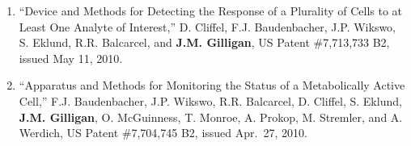 %
%
\begin{enumerate}
	\item ``Device and Methods for Detecting the Response of a Plurality of Cells to at Least One Analyte of Interest,'' D. Cliffel, F.J. Baudenbacher, J.P. Wikswo, S. Eklund, R.R. Balcarcel, and \textbf{J.M. Gilligan}, US Patent \#7,713,733 B2, issued May 11, 2010.
	\item ``Apparatus and Methods for Monitoring the Status of a Metabolically Active Cell,'' F.J. Baudenbacher, J.P. Wikswo, R.R. Balcarcel, D. Cliffel, S. Eklund, \textbf{J.M. Gilligan}, O. McGuinness, T. Monroe, A.
	Prokop, M. Stremler, and A. Werdich, US Patent \#7,704,745 B2, issued Apr.~27, 2010.
\end{enumerate}